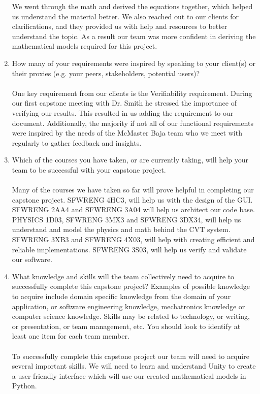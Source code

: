 \documentclass[12pt]{article}
\begin{document}
\begin{enumerate}
  We went through the math and derived the equations together, which helped us understand the material better.
  We also reached out to our clients for clarifications, and they provided us with help and resources to better understand the topic. 
  As a result our team was more confident in deriving the mathematical models required for this project.   
  \item How many of your requirements were inspired by speaking to your
  client(s) or their proxies (e.g. your peers, stakeholders, potential users)?
  \\\\
  One key requirement from our clients is the Verifiability requirement.
  During our first capstone meeting with Dr. Smith he stressed the importance of verifying our results.
  This resulted  in us adding the requirement to our document.
  Additionally, the majority if not all of our functional requirements were inspired by the needs of the McMaster Baja team who we meet with regularly to gather feedback and insights.
  \item Which of the courses you have taken, or are currently taking, will help
  your team to be successful with your capstone project.
  \\\\
  Many of the courses we have taken so far will prove helpful in completing our capstone project.
  SFWRENG 4HC3, will help us with the design of the GUI.
  SFWRENG 2AA4 and SFWRENG 3A04 will help us architect our code base.
  PHYSICS 1D03, SFWRENG 3MX3 and SFWRENG 3DX34, will help us understand and model the physics and math behind the CVT system.
  SFWRENG 3XB3 and SFWRENG 4X03, will help with creating efficient and reliable implementations.
  SFWRENG 3S03, will help us verify and validate our software.
  \item What knowledge and skills will the team collectively need to acquire to
  successfully complete this capstone project?  Examples of possible knowledge
  to acquire include domain specific knowledge from the domain of your
  application, or software engineering knowledge, mechatronics knowledge or
  computer science knowledge.  Skills may be related to technology, or writing,
  or presentation, or team management, etc.  You should look to identify at
  least one item for each team member.
  \\\\
  To successfully complete this capstone project our team will need to acquire several important skills.
  We will need to learn and understand Unity to create a user-friendly interface which will use our created mathematical models in Python.

\end{enumerate}
\end{document}
